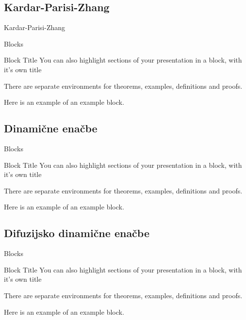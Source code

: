 \documentclass{beamer}
\begin{document}
\subsection{Kardar-Parisi-Zhang}

\begin{frame}{Kardar-Parisi-Zhang}{}
\end{frame}


\begin{frame}{Blocks}
\begin{block}{Block Title}
You can also highlight sections of your presentation in a block, with it's own title
\end{block}
\begin{theorem}
There are separate environments for theorems, examples, definitions and proofs.
\end{theorem}
\begin{example}
Here is an example of an example block.
\end{example}
\end{frame}


\subsection{Dinamične enačbe}

\begin{frame}{Blocks}
\begin{block}{Block Title}
You can also highlight sections of your presentation in a block, with it's own title
\end{block}
\begin{theorem}
There are separate environments for theorems, examples, definitions and proofs.
\end{theorem}
\begin{example}
Here is an example of an example block.
\end{example}
\end{frame}

\subsection{Difuzijsko dinamične enačbe}

\begin{frame}{Blocks}
\begin{block}{Block Title}
You can also highlight sections of your presentation in a block, with it's own title
\end{block}
\begin{theorem}
There are separate environments for theorems, examples, definitions and proofs.
\end{theorem}
\begin{example}
Here is an example of an example block.
\end{example}
\end{frame}
\end{document}
